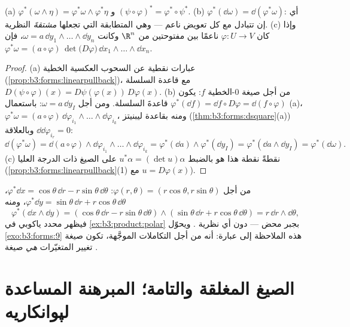 \begin{theorem}\label{thm:b3:forms:pullback}
(a) $\varphi^*(\omega \wedge \eta) = \varphi^*\omega \wedge
\varphi^*\eta$ و $(\psi \circ \varphi)^* = \varphi^* \circ
\psi^*$.
(b) $\varphi^*(\dd\omega) = \dd(\varphi^*\omega)$: أي إن  تتبادل مع كل تعويض ناعم ---
وهي المتطابقة التي تجعلها \emph{مشتقةَ} النظرية.
(c) وإذا كان $\varphi\colon U \to V$ ناعمًا بين مفتوحتين من $\R^n$ وكانت $\omega = a\,\dd y_1 \wedge \dots \wedge \dd
y_n$،
فإن $\varphi^*\omega = (a \circ
\varphi)\,\det\bigl(D\varphi\bigr)\,\dd x_1 \wedge \dots
\wedge \dd x_n$.
\end{theorem}

\begin{proof}
(a) عبارات نقطية عن السحوب العكسية الخطية (\cref{prop:b3:forms:linearpullback})، مع
قاعدة السلسلة $D(\psi\circ\varphi)(x) = D\psi(\varphi(x))\,D\varphi(x)$.
(b) من أجل صيغة $0$-الخطية $f$: يكون $\varphi^*(\dd f) = \dd f \circ
D\varphi = \dd(f \circ \varphi)$ قاعدةَ السلسلة.
ومن أجل $\omega = a\,\dd y_I$: باستعمال (a)، $\varphi^*\omega =
(a\circ\varphi)\,\dd\varphi_{i_1}\wedge\dots\wedge
\dd\varphi_{i_k}$، ومنه بقاعدة ليبنيتز
(\cref{thm:b3:forms:dsquare}(a)) وبالعلاقة $\dd\dd\varphi_{i_r} =
0$:
\[
\dd(\varphi^*\omega) = \dd(a\circ\varphi) \wedge
\dd\varphi_{i_1}\wedge\dots\wedge\dd\varphi_{i_k}
= \varphi^*(\dd a) \wedge \varphi^*(\dd y_I)
= \varphi^*(\dd a \wedge \dd y_I) =
\varphi^*(\dd\omega).
\]
(c) نقطةً نقطة هذا هو بالضبط $u^*\alpha = (\det u)\alpha$ على الصيغ ذات الدرجة
العليا (\cref{prop:b3:forms:linearpullback}(1) مع $u = D\varphi(x)$).
\end{proof}

\begin{example}\label{ex:b3:forms:polar}
من أجل $\varphi(r, \theta) = (r\cos\theta, r\sin\theta)$: $\varphi^*\dd x = \cos\theta\,\dd r -
r\sin\theta\,\dd\theta$، $\varphi^*\dd y = \sin\theta\,\dd r
+ r\cos\theta\,\dd\theta$، ومنه
\[
\varphi^*(\dd x \wedge \dd y) =
(\cos\theta\,\dd r - r\sin\theta\,\dd\theta) \wedge
(\sin\theta\,\dd r + r\cos\theta\,\dd\theta)
= r\,\dd r \wedge \dd\theta,
\]
فيظهر محدد ياكوبي في \cref{ex:b3:product:polar} بجبر محض --- دون أي نظرية
. ويحوّل \cref{exo:b3:forms:9} هذه الملاحظة إلى عبارة: أنه من أجل
التكاملات الموجَّهة، تكون صيغة تغيير المتغيّرات \emph{هي} صيغة
.
\end{example}

\section{الصيغ المغلقة والتامة؛ المبرهنة المساعدة لپوانكاريه}

